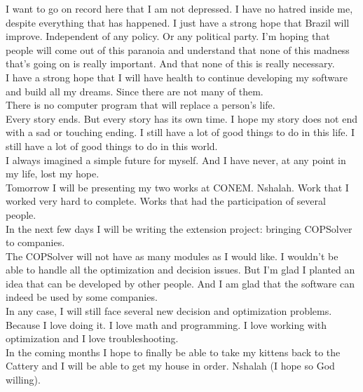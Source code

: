\documentclass[11pt]{book}
\begin{document}
\noindent I want to go on record here that I am not depressed. I have no hatred inside me, despite everything that has happened. I just have a strong hope that Brazil will improve. Independent of any policy. Or any political party. I'm hoping that people will come out of this paranoia and understand that none of this madness that's going on is really important. And that none of this is really necessary. \\

\noindent I have a strong hope that I will have health to continue developing my software and build all my dreams. Since there are not many of them. \\

\noindent There is no computer program that will replace a person's life. \\

\noindent Every story ends. But every story has its own time. I hope my story does not end with a sad or touching ending. I still have a lot of good things to do in this life.  I still have a lot of good things to do in this world. \\

\noindent I always imagined a simple future for myself. And I have never, at any point in my life, lost my hope. \\

\noindent Tomorrow I will be presenting my two works at CONEM. Nshalah. Work that I worked very hard to complete. Works that had the participation of several people. \\

\noindent In the next few days I will be writing the extension project: bringing COPSolver to companies. \\

\noindent The COPSolver will not have as many modules as I would like. I wouldn't be able to handle all the optimization and decision issues. But I'm glad I planted an idea that can be developed by other people. And I am glad that the software can indeed be used by some companies. \\

\noindent In any case, I will still face several new decision and optimization problems. Because I love doing it. I love math and programming. I love working with optimization and I love troubleshooting. \\

\noindent In the coming months I hope to finally be able to take my kittens back to the Cattery and I will be able to get my house in order. Nshalah (I hope so God willing). \\
\end{document}
